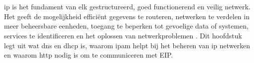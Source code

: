\chapter{}%
\label{ch:stand-van-zaken}



%
%
%
%

\acrfull{ip} is het fundament van elk gestructureerd, goed functionerend en veilig netwerk. Het geeft de mogelijkheid efficiënt gegevens te routeren, netwerken te verdelen in meer beheersbare eenheden, toegang te beperken tot gevoelige data of systemen, services te identificeren en het oplossen van netwerkproblemen \autocite{Postel1981}. Dit hoofdstuk legt uit wat \acrfull{dns} en \acrfull{dhcp} is, waarom \acrshort{ipam} helpt bij het beheren van \acrshort{ip} netwerken en waarom \acrshort{http} nodig is om te communiceren met EIP. 

